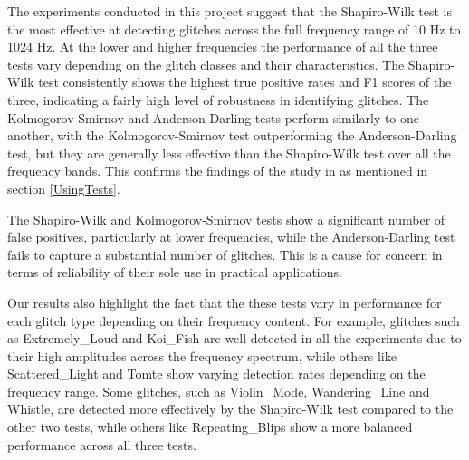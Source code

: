 \documentclass[12pt]{article}
\begin{document}
\medskip
\noindent The experiments conducted in this project suggest that the Shapiro-Wilk test is the most effective at detecting glitches across the full frequency range of 10 Hz to 1024 Hz. At the lower and higher frequencies the performance of all the three tests vary depending on the glitch classes and their characteristics. The Shapiro-Wilk test consistently shows the highest true positive rates and F1 scores of the three, indicating a fairly high level of robustness in identifying glitches. The Kolmogorov-Smirnov and Anderson-Darling tests perform similarly to one another, with the Kolmogorov-Smirnov test outperforming the Anderson-Darling test, but they are generally less effective than the Shapiro-Wilk test over all the frequency bands. This confirms the findings of the study in \cite{razali2011power} as mentioned in section \ref{UsingTests}.

\medskip
\noindent The Shapiro-Wilk and Kolmogorov-Smirnov tests show a significant number of false positives, particularly at lower frequencies, while the Anderson-Darling test fails to capture a substantial number of glitches. This is a cause for concern in terms of reliability of their sole use in practical applications.

\medskip
\noindent Our results also highlight the fact that the these tests vary in performance for each glitch type depending on their frequency content. For example, glitches such as Extremely\_Loud and Koi\_Fish are well detected in all the experiments due to their high amplitudes across the frequency spectrum, while others like Scattered\_Light and Tomte show varying detection rates depending on the frequency range. Some glitches, such as Violin\_Mode, Wandering\_Line and Whistle, are detected more effectively by the Shapiro-Wilk test compared to the other two tests, while others like Repeating\_Blips show a more balanced performance across all three tests.
\end{document}
